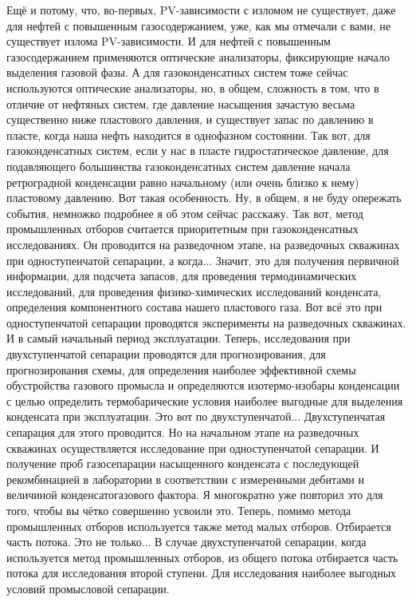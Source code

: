 \documentclass[main.tex]{subfiles}
\begin{document}
Ещё и потому, что, во-первых, PV-зависимости с изломом не существует, даже для нефтей с повышенным газосодержанием, уже, как мы отмечали с вами, не существует излома PV-зависимости.
И для нефтей с повышенным газосодержанием применяются оптические анализаторы, фиксирующие начало выделения газовой фазы.
А для газоконденсатных систем тоже сейчас используются оптические анализаторы, но, в общем, сложность в том, что в отличие от нефтяных систем, где давление насыщения зачастую весьма существенно ниже пластового давления, и существует запас по давлению в пласте, когда наша нефть находится в однофазном состоянии.
Так вот, для газоконденсатных систем, если у нас в пласте гидростатическое давление, для подавляющего большинства газоконденсатных систем давление начала ретроградной конденсации равно начальному (или очень близко к нему) пластовому давлению.
Вот такая особенность.
Ну, в общем, я не буду опережать события, немножко подробнее я об этом сейчас расскажу.
Так вот, метод промышленных отборов считается приоритетным при газоконденсатных исследованиях.
Он проводится на разведочном этапе, на разведочных скважинах при одноступенчатой сепарации, а когда...
Значит, это для получения первичной информации, для подсчета запасов, для проведения термодинамических исследований, для проведения физико-химических исследований конденсата, определения компонентного состава нашего пластового газа.
Вот всё это при одноступенчатой сепарации проводятся эксперименты на разведочных скважинах.
И в самый начальный период эксплуатации.
Теперь, исследования при двухступенчатой сепарации проводятся для прогнозирования, для прогнозирования схемы, для определения наиболее эффективной схемы обустройства газового промысла и определяются изотермо-изобары конденсации с целью определить термобарические условия наиболее выгодные для выделения конденсата при эксплуатации.
Это вот по двухступенчатой... Двухступенчатая сепарация для этого проводится.
Но на начальном этапе на разведочных скважинах осуществляется исследование при одноступенчатой сепарации.
И получение проб газосепарации насыщенного конденсата с последующей рекомбинацией в лаборатории в соответствии с измеренными дебитами и величиной конденсатогазового фактора.
Я многократно уже повторил это для того, чтобы вы чётко совершенно усвоили это.
Теперь, помимо метода промышленных отборов используется также метод малых отборов.
Отбирается часть потока.
Это не только...
В случае двухступенчатой сепарации, когда используется метод промышленных отборов, из общего потока отбирается часть потока для исследования второй ступени.
Для исследования наиболее выгодных условий промысловой сепарации.
\end{document}
